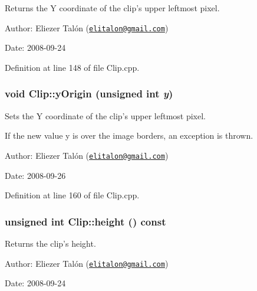 Returns the Y coordinate of the clip's upper leftmost pixel. 

\begin{Desc}
\item[Author:]Eliezer Talón (\href{mailto:elitalon@gmail.com}{\tt elitalon@gmail.com}) \end{Desc}
\begin{Desc}
\item[Date:]2008-09-24 \end{Desc}


Definition at line 148 of file Clip.cpp.\hypertarget{class_clip_6b0100fdd089be816b97465df4dd2846}{
\subsubsection[yOrigin]{\setlength{\rightskip}{0pt plus 5cm}void Clip::yOrigin (unsigned int {\em y})}}
\label{class_clip_6b0100fdd089be816b97465df4dd2846}


Sets the Y coordinate of the clip's upper leftmost pixel. 

If the new value y is over the image borders, an exception is thrown.

\begin{Desc}
\item[Author:]Eliezer Talón (\href{mailto:elitalon@gmail.com}{\tt elitalon@gmail.com}) \end{Desc}
\begin{Desc}
\item[Date:]2008-09-26 \end{Desc}


Definition at line 160 of file Clip.cpp.\hypertarget{class_clip_393710a6b136f400dd5c900f8831e1a8}{
\subsubsection[height]{\setlength{\rightskip}{0pt plus 5cm}unsigned int Clip::height () const}}
\label{class_clip_393710a6b136f400dd5c900f8831e1a8}


Returns the clip's height. 

\begin{Desc}
\item[Author:]Eliezer Talón (\href{mailto:elitalon@gmail.com}{\tt elitalon@gmail.com}) \end{Desc}
\begin{Desc}
\item[Date:]2008-09-24 \end{Desc}



